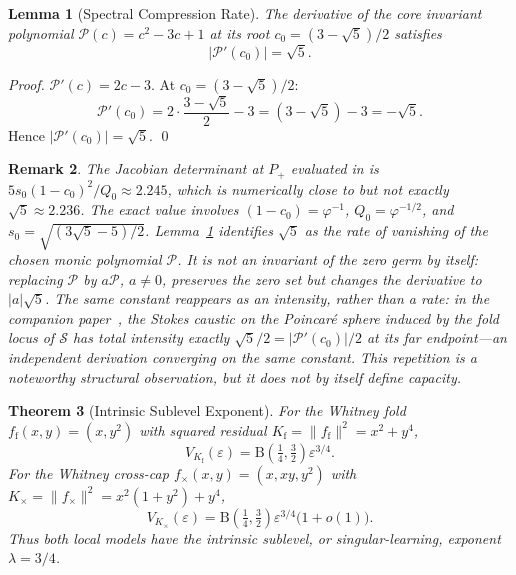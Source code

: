 \documentclass[11pt]{article}
\newtheorem{theorem}{Theorem}[section]
\newtheorem{lemma}[theorem]{Lemma}
\newtheorem{remark}[theorem]{Remark}
\begin{document}
\begin{lemma}[Spectral Compression Rate]
\label{lem:sqrt5}
The derivative of the core invariant polynomial $\mathcal{P}(c) = c^2 - 3c + 1$
at its root $c_0 = (3-\sqrt{5})/2$ satisfies
\[
  |\mathcal{P}'(c_0)| = \sqrt{5}.
\]
\end{lemma}

\begin{proof}
$\mathcal{P}'(c) = 2c - 3$.  At $c_0 = (3-\sqrt{5})/2$:
\[
  \mathcal{P}'(c_0)
  = 2\cdot\frac{3-\sqrt{5}}{2} - 3
  = (3-\sqrt{5}) - 3
  = -\sqrt{5}.
\]
Hence $|\mathcal{P}'(c_0)| = \sqrt{5}$. \qed
\end{proof}

\begin{remark}
The Jacobian determinant at $P_+$ evaluated in \cite{HayamiRuledSurface2026} is
$5s_0(1-c_0)^2/Q_0 \approx 2.245$, which is numerically close to but not exactly
$\sqrt{5} \approx 2.236$.  The exact value involves
$(1-c_0) = \varphi^{-1}$, $Q_0 = \varphi^{-1/2}$, and
$s_0 = \sqrt{(3\sqrt{5}-5)/2}$.
Lemma~\ref{lem:sqrt5} identifies $\sqrt{5}$ as the rate of vanishing of the
\emph{chosen monic polynomial} $\mathcal P$.  It is not an invariant of the zero
germ by itself: replacing $\mathcal P$ by $a\mathcal P$, $a\ne0$, preserves the
zero set but changes the derivative to $|a|\sqrt5$.  The
same constant reappears as an intensity, rather than a rate: in the
companion paper~\cite{HayamiStokesCaustic2026}, the Stokes caustic on the
Poincar\'{e} sphere induced by the fold locus of $\mathcal{S}$ has total
intensity exactly $\sqrt5/2=|\mathcal{P}'(c_0)|/2$ at its far endpoint---an
independent derivation converging on the same constant.  This repetition is a
noteworthy structural observation, but it does not by itself define capacity.
\end{remark}

\begin{theorem}[Intrinsic Sublevel Exponent]
\label{thm:sublevel_exponent}
For the Whitney fold $f_{\mathrm f}(x,y)=(x,y^2)$ with squared residual
$K_{\mathrm f}=\|f_{\mathrm f}\|^2=x^2+y^4$,
\[
  V_{K_{\mathrm f}}(\varepsilon)
  =\mathrm B\!\left(\tfrac14,\tfrac32\right)\varepsilon^{3/4}.
\]
For the Whitney cross-cap $f_\times(x,y)=(x,xy,y^2)$ with
$K_\times=\|f_\times\|^2=x^2(1+y^2)+y^4$,
\[
  V_{K_\times}(\varepsilon)
  =\mathrm B\!\left(\tfrac14,\tfrac32\right)
   \varepsilon^{3/4}\bigl(1+o(1)\bigr).
\]
Thus both local models have the intrinsic sublevel, or singular-learning,
exponent $\lambda=3/4$.
\end{theorem}
\end{document}
